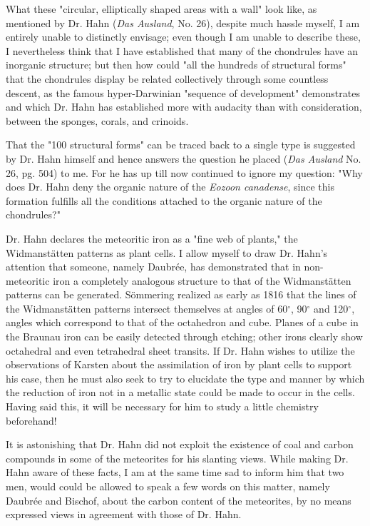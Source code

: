 \documentclass[a4paper, 12pt, oneside]{article}
\begin{document}
What these "circular, elliptically shaped areas with a wall" look like, as mentioned by Dr. Hahn (\emph{Das Ausland}, No. 26), despite much hassle myself, I am entirely unable to distinctly envisage; even though I am unable to describe these, I nevertheless think that I have established that many of the chondrules have an inorganic structure; but then how could "all the hundreds of structural forms" that the chondrules display be related collectively through some countless descent, as the famous hyper-Darwinian "sequence of development" demonstrates and which Dr. Hahn has established more with audacity than with consideration, between the sponges, corals, and crinoids.

That the "100 structural forms" can be traced back to a single type is suggested by Dr. Hahn himself and hence answers the question he placed (\emph{Das Ausland} No. 26, pg. 504) to me. For he has up till now continued to ignore my question: "Why does Dr. Hahn deny the organic nature of the \emph{Eozoon canadense}, since this formation fulfills all the conditions attached to the organic nature of the chondrules?"

Dr. Hahn declares the meteoritic iron as a "fine web of plants," the Widmanstätten patterns as plant cells. I allow myself to draw Dr. Hahn's attention that someone, namely Daubrée, has demonstrated that in non-meteoritic iron a completely analogous structure to that of the Widmanstätten patterns can be generated. Sömmering realized as early as 1816 that the lines of the Widmanstätten patterns intersect themselves at angles of 60$^{\circ}$, 90$^{\circ}$ and 120$^{\circ}$, angles which correspond to that of the octahedron and cube. Planes of a cube in the Braunau iron can be easily detected through etching; other irons clearly show octahedral and even tetrahedral sheet transits. If Dr. Hahn wishes to utilize the observations of Karsten about the assimilation of iron by plant cells to support his case, then he must also seek to try to elucidate the type and manner by which the reduction of iron not in a metallic state could be made to occur in the cells. Having said this, it will be necessary for him to study a little chemistry beforehand!

It is astonishing that Dr. Hahn did not exploit the existence of coal and carbon compounds in some of the meteorites for his slanting views. While making Dr. Hahn aware of these facts, I am at the same time sad to inform him that two men, would could be allowed to speak a few words on this matter, namely Daubrée and Bischof, about the carbon content of the meteorites, by no means expressed views in agreement with those of Dr. Hahn.
\end{document}
